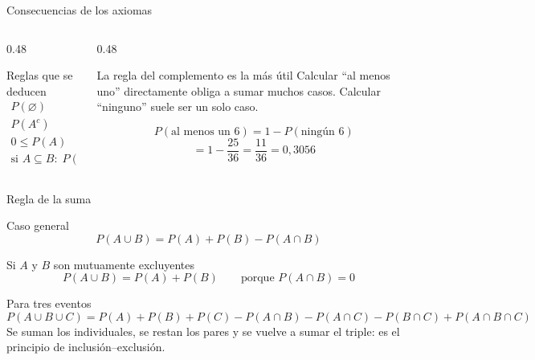 \documentclass[aspectratio=169,10pt]{beamer}
\begin{document}
\begin{frame}{Consecuencias de los axiomas}
  \small
  \begin{columns}[T,onlytextwidth]
    \begin{column}{0.48\textwidth}
      \begin{block}{Reglas que se deducen}
        \begin{align*}
          P(\varnothing) &= 0\\[0.2em]
          P(A^{c}) &= 1-P(A)\\[0.2em]
          0 \le P(A) &\le 1\\[0.2em]
          \text{si } A\subseteq B:\; P(A) &\le P(B)
        \end{align*}
      \end{block}
    \end{column}
    \begin{column}{0.48\textwidth}
      \begin{exampleblock}{La regla del complemento es la más útil}
        \footnotesize
        Calcular ``al menos uno'' directamente obliga a sumar muchos casos.
        Calcular ``ninguno'' suele ser un solo caso.

        \vspace{0.2cm}
        \[ P(\text{al menos un 6})=1-P(\text{ningún 6}) \]
        \[ = 1-\frac{25}{36}=\frac{11}{36}=0{,}3056 \]
      \end{exampleblock}
    \end{column}
  \end{columns}
\end{frame}

\begin{frame}{Regla de la suma}
  \begin{block}{Caso general}
    \[ P(A\cup B)=P(A)+P(B)-P(A\cap B) \]
  \end{block}

  \begin{block}{Si $A$ y $B$ son mutuamente excluyentes}
    \[ P(A\cup B)=P(A)+P(B) \qquad\text{porque } P(A\cap B)=0 \]
  \end{block}

  \vspace{0.2cm}
  \begin{alertblock}{Para tres eventos}
    \footnotesize
    \[ P(A\cup B\cup C)=P(A)+P(B)+P(C)-P(A\cap B)-P(A\cap C)-P(B\cap C)
       +P(A\cap B\cap C) \]
    Se suman los individuales, se restan los pares y se vuelve a sumar el
    triple: es el principio de inclusión--exclusión.
  \end{alertblock}
\end{frame}
\end{document}
